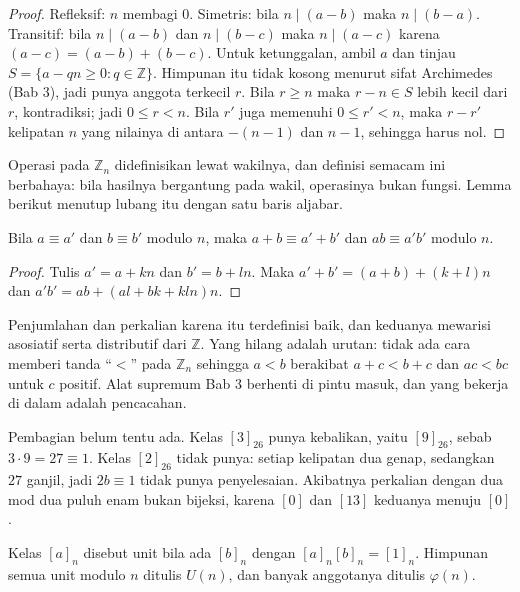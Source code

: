 \begin{proof}
Refleksif: $n$ membagi $0$. Simetris: bila $n\mid(a-b)$ maka $n\mid(b-a)$. Transitif: bila
$n\mid(a-b)$ dan $n\mid(b-c)$ maka $n\mid(a-c)$ karena $(a-c)=(a-b)+(b-c)$. Untuk
ketunggalan, ambil $a$ dan tinjau $S=\{a-qn\ge0: q\in\mathbb{Z}\}$. Himpunan itu tidak kosong
menurut sifat Archimedes (Bab 3), jadi punya anggota terkecil $r$. Bila $r\ge n$ maka
$r-n\in S$ lebih kecil dari $r$, kontradiksi; jadi $0\le r<n$. Bila $r'$ juga memenuhi
$0\le r'<n$, maka $r-r'$ kelipatan $n$ yang nilainya di antara $-(n-1)$ dan $n-1$, sehingga
harus nol.
\end{proof}

Operasi pada $\mathbb{Z}_n$ didefinisikan lewat wakilnya, dan definisi semacam ini berbahaya:
bila hasilnya bergantung pada wakil, operasinya bukan fungsi. Lemma berikut menutup lubang itu
dengan satu baris aljabar.

\begin{lemma}
Bila $a\equiv a'$ dan $b\equiv b'$ modulo $n$, maka $a+b\equiv a'+b'$ dan $ab\equiv a'b'$
modulo $n$.
\end{lemma}

\begin{proof}
Tulis $a'=a+kn$ dan $b'=b+ln$. Maka $a'+b'=(a+b)+(k+l)n$ dan $a'b'=ab+(al+bk+kln)n$.
\end{proof}

Penjumlahan dan perkalian karena itu terdefinisi baik, dan keduanya mewarisi asosiatif serta
distributif dari $\mathbb{Z}$. Yang hilang adalah urutan: tidak ada cara memberi tanda
``$<$'' pada $\mathbb{Z}_n$ sehingga $a<b$ berakibat $a+c<b+c$ dan $ac<bc$ untuk $c$ positif.
Alat supremum Bab 3 berhenti di pintu masuk, dan yang bekerja di dalam adalah pencacahan.

Pembagian belum tentu ada. Kelas $[3]_{26}$ punya kebalikan, yaitu $[9]_{26}$, sebab
$3\cdot9=27\equiv1$. Kelas $[2]_{26}$ tidak punya: setiap kelipatan dua genap, sedangkan
$27$ ganjil, jadi $2b\equiv1$ tidak punya penyelesaian. Akibatnya perkalian dengan dua mod dua
puluh enam bukan bijeksi, karena $[0]$ dan $[13]$ keduanya menuju $[0]$.


\begin{definisi}
Kelas $[a]_n$ disebut unit bila ada $[b]_n$ dengan $[a]_n[b]_n=[1]_n$. Himpunan semua unit
modulo $n$ ditulis $U(n)$, dan banyak anggotanya ditulis $\varphi(n)$.
\end{definisi}

